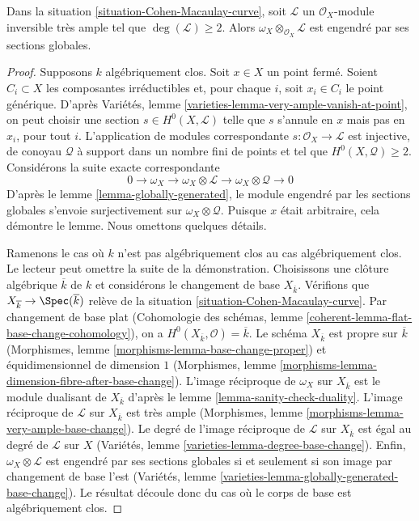 \begin{lemma}
\label{lemma-tensor-omega-with-globally-generated-invertible}
Dans la situation \ref{situation-Cohen-Macaulay-curve}, soit $\mathcal{L}$ un $\mathcal{O}_X$-module inversible très ample tel que $\deg(\mathcal{L}) \geq 2$. Alors $\omega_X \otimes_{\mathcal{O}_X} \mathcal{L}$ est engendré par ses sections globales.
\end{lemma}

\begin{proof}
Supposons $k$ algébriquement clos. Soit $x \in X$ un point fermé. Soient $C_i \subset X$ les composantes irréductibles et, pour chaque $i$, soit $x_i \in C_i$ le point générique. D'après Variétés, lemme \ref{varieties-lemma-very-ample-vanish-at-point}, on peut choisir une section $s \in H^0(X, \mathcal{L})$ telle que $s$ s'annule en $x$ mais pas en $x_i$, pour tout $i$. L'application de modules correspondante $s : \mathcal{O}_X \to \mathcal{L}$ est injective, de conoyau $\mathcal{Q}$ à support dans un nombre fini de points et tel que $H^0(X, \mathcal{Q}) \geq 2$. Considérons la suite exacte correspondante $$
0 \to \omega_X \to \omega_X \otimes \mathcal{L} \to
\omega_X \otimes \mathcal{Q} \to 0
$$ D'après le lemme \ref{lemma-globally-generated}, le module engendré par les sections globales s'envoie surjectivement sur $\omega_X \otimes \mathcal{Q}$. Puisque $x$ était arbitraire, cela démontre le lemme. Nous omettons quelques détails.

\medskip\noindent
Ramenons le cas où $k$ n'est pas algébriquement clos au cas algébriquement clos. Le lecteur peut omettre la suite de la démonstration. Choisissons une clôture algébrique $\overline{k}$ de $k$ et considérons le changement de base $X_{\overline{k}}$. Vérifions que $X_{\overline{k}} \to \Spec(\overline{k})$ relève de la situation \ref{situation-Cohen-Macaulay-curve}. Par changement de base plat (Cohomologie des schémas, lemme \ref{coherent-lemma-flat-base-change-cohomology}), on a $H^0(X_{\overline{k}}, \mathcal{O}) = \overline{k}$. Le schéma $X_{\overline{k}}$ est propre sur $\overline{k}$ (Morphismes, lemme \ref{morphisms-lemma-base-change-proper}) et équidimensionnel de dimension $1$ (Morphismes, lemme \ref{morphisms-lemma-dimension-fibre-after-base-change}). L'image réciproque de $\omega_X$ sur $X_{\overline{k}}$ est le module dualisant de $X_{\overline{k}}$ d'après le lemme \ref{lemma-sanity-check-duality}. L'image réciproque de $\mathcal{L}$ sur $X_{\overline{k}}$ est très ample (Morphismes, lemme \ref{morphisms-lemma-very-ample-base-change}). Le degré de l'image réciproque de $\mathcal{L}$ sur $X_{\overline{k}}$ est égal au degré de $\mathcal{L}$ sur $X$ (Variétés, lemme \ref{varieties-lemma-degree-base-change}). Enfin, $\omega_X \otimes \mathcal{L}$ est engendré par ses sections globales si et seulement si son image par changement de base l'est (Variétés, lemme \ref{varieties-lemma-globally-generated-base-change}). Le résultat découle donc du cas où le corps de base est algébriquement clos.
\end{proof}




